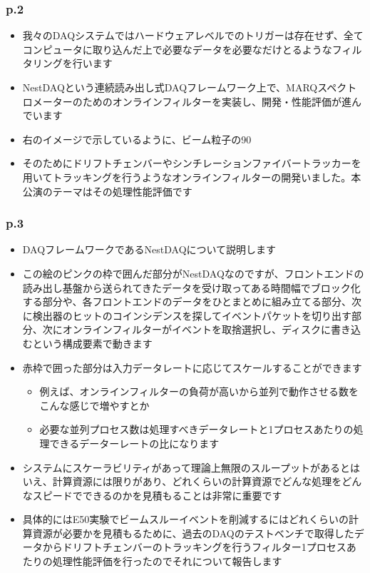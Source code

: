 \documentclass[12pt,a4paper,upLaTeX]{jsarticle}
\begin{document}
\subsubsection*{p.2}
\begin{itemize}
\item 我々のDAQシステムではハードウェアレベルでのトリガーは存在せず、全てコンピュータに取り込んだ上で必要なデータを必要なだけとるようなフィルタリングを行います
\item NestDAQという連続読み出し式DAQフレームワーク上で、MARQスペクトロメーターのためのオンラインフィルターを実装し、開発・性能評価が進んでいます
\item 右のイメージで示しているように、ビーム粒子の90%
\item そのためにドリフトチェンバーやシンチレーションファイバートラッカーを用いてトラッキングを行うようなオンラインフィルターの開発いました。本公演のテーマはその処理性能評価です
\end{itemize}

\subsubsection*{p.3}
\begin{itemize}
\item DAQフレームワークであるNestDAQについて説明します
\item この絵のピンクの枠で囲んだ部分がNestDAQなのですが、フロントエンドの読み出し基盤から送られてきたデータを受け取ってある時間幅でブロック化する部分や、各フロントエンドのデータをひとまとめに組み立てる部分、次に検出器のヒットのコインシデンスを探してイベントパケットを切り出す部分、次にオンラインフィルターがイベントを取捨選択し、ディスクに書き込むという構成要素で動きます
\item 赤枠で囲った部分は入力データレートに応じてスケールすることができます
\begin{itemize}
\item 例えば、オンラインフィルターの負荷が高いから並列で動作させる数をこんな感じで増やすとか
\item 必要な並列プロセス数は処理すべきデータレートと1プロセスあたりの処理できるデーターレートの比になります
\end{itemize}
\item システムにスケーラビリティがあって理論上無限のスループットがあるとはいえ、計算資源には限りがあり、どれくらいの計算資源でどんな処理をどんなスピードでできるのかを見積もることは非常に重要です
\item 具体的にはE50実験でビームスルーイベントを削減するにはどれくらいの計算資源が必要かを見積もるために、過去のDAQのテストベンチで取得したデータからドリフトチェンバーのトラッキングを行うフィルター1プロセスあたりの処理性能評価を行ったのでそれについて報告します
\end{itemize}
\end{document}
